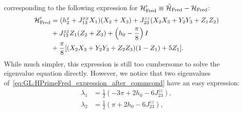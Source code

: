 corresponding to the following expression for ${\mathcal{H}}'_{\operatorname{Fred}}\equiv\tilde{{\mathcal{H}}}_{\operatorname{Fred}}-{\mathcal{H}}_{\operatorname{Fred}}$:
\begin{equation}
\begin{aligned}
    {\mathcal{H}}'_{\operatorname{Fred}} &=
    (h_2^x + J_{13}^{xx} X_1)(X_2+X_3)
    + J_{23}^{zz} (X_2 X_3 + Y_2 Y_3 + Z_1 Z_2) \\
    &+ J_{13}^{zz} Z_1 (Z_2 + Z_3)
    + \left(h_0 - \frac{\pi}{8}\right) I \\
    &+ \frac{\pi}{8} [
        (X_2 X_3 + Y_2 Y_3 + Z_2 Z_3) (1 - Z_1)
        + 5 Z_1
    ].
\end{aligned}
\label{eq:GL:HPrimeFred_expression_after_commcond}
\end{equation}
While much simpler, this expression is still too cumbersome to solve the eigenvalue equation directly.
However, we notice that two eigenvalues of~\cref{eq:GL:HPrimeFred_expression_after_commcond} have an easy expression:
\begin{equation}
\begin{aligned}
    \lambda_1 &= \frac{1}{2}( -3\pi + 2h_0 - 6J_{23}^{zz}), \\
    \lambda_2 &= \frac{1}{2}( \pi   + 2h_0 - 6J_{23}^{zz}),
\end{aligned}
\label{eq:GL:fredkin_first_two_nice_eigenvalues}
\end{equation}


